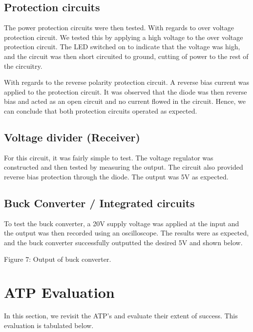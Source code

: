 \documentclass[class=report,11pt,crop=false]{standalone}
\begin{document}
\subsection{Protection circuits}

The power protection circuits were then tested. With regards to over voltage protection circuit. We tested this by applying a high voltage to the over voltage protection circuit. The LED switched on to indicate that the voltage was high, and the circuit was then short circuited to ground, cutting of power to the rest of the circuitry.

With regards to the reverse polarity protection circuit. A reverse bias current was applied to the protection circuit. It was observed that the diode was then reverse bias and acted as an open circuit and no current flowed in the circuit. Hence, we can conclude that both protection circuits operated as expected.

\subsection{Voltage divider (Receiver)}

For this circuit, it was fairly simple to test. The voltage regulator was constructed and then tested by measuring the output. The circuit also provided reverse bias protection through the diode. The output was 5V as expected.

\subsection{Buck Converter / Integrated circuits}

To test the buck converter, a 20V supply voltage was applied at the input and the output was then recorded using an oscilloscope. The results were as expected, and the buck converter successfully outputted the desired 5V and shown below.

Figure 7: Output of buck converter.

\section{ATP Evaluation}

In this section, we revisit the ATP’s and evaluate their extent of success. This evaluation is tabulated below.
\end{document}
